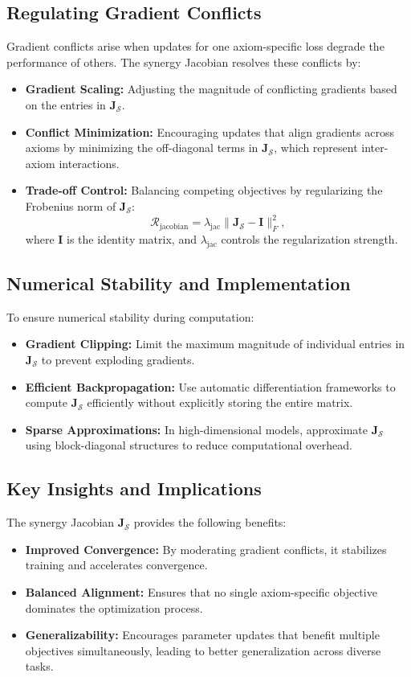 \subsection{Regulating Gradient Conflicts}
Gradient conflicts arise when updates for one axiom-specific loss degrade the performance of others. The synergy Jacobian resolves these conflicts by:
\begin{itemize}
    \item \textbf{Gradient Scaling:} Adjusting the magnitude of conflicting gradients based on the entries in \(\mathbf{J}_{\mathcal{S}}\).
    \item \textbf{Conflict Minimization:} Encouraging updates that align gradients across axioms by minimizing the off-diagonal terms in \(\mathbf{J}_{\mathcal{S}}\), which represent inter-axiom interactions.
    \item \textbf{Trade-off Control:} Balancing competing objectives by regularizing the Frobenius norm of \(\mathbf{J}_{\mathcal{S}}\):
    \[
    \mathcal{R}_{\text{jacobian}} = \lambda_{\text{jac}} \|\mathbf{J}_{\mathcal{S}} - \mathbf{I}\|_F^2,
    \]
    where \(\mathbf{I}\) is the identity matrix, and \(\lambda_{\text{jac}}\) controls the regularization strength.
\end{itemize}


\subsection{Numerical Stability and Implementation}
To ensure numerical stability during computation:
\begin{itemize}
    \item \textbf{Gradient Clipping:} Limit the maximum magnitude of individual entries in \(\mathbf{J}_{\mathcal{S}}\) to prevent exploding gradients.
    \item \textbf{Efficient Backpropagation:} Use automatic differentiation frameworks to compute \(\mathbf{J}_{\mathcal{S}}\) efficiently without explicitly storing the entire matrix.
    \item \textbf{Sparse Approximations:} In high-dimensional models, approximate \(\mathbf{J}_{\mathcal{S}}\) using block-diagonal structures to reduce computational overhead.
\end{itemize}

\subsection{Key Insights and Implications}
The synergy Jacobian \(\mathbf{J}_{\mathcal{S}}\) provides the following benefits:
\begin{itemize}
    \item \textbf{Improved Convergence:} By moderating gradient conflicts, it stabilizes training and accelerates convergence.
    \item \textbf{Balanced Alignment:} Ensures that no single axiom-specific objective dominates the optimization process.
    \item \textbf{Generalizability:} Encourages parameter updates that benefit multiple objectives simultaneously, leading to better generalization across diverse tasks.
\end{itemize}


